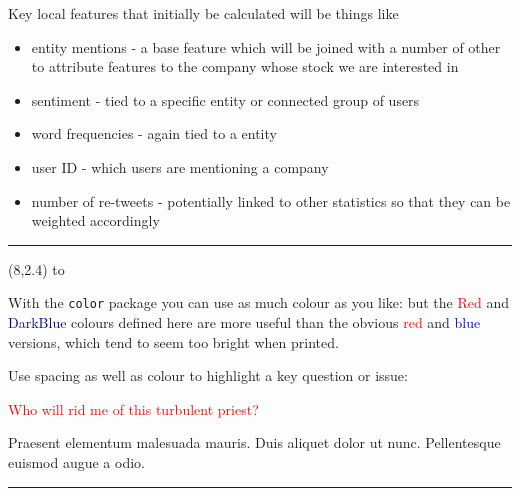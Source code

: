 \documentclass[a0]{a0poster}
\def\Head#1{\noindent\hbox to \hsize{\hfil{\LARGE\color{DarkBlue}\sf #1}}\bigskip}
\begin{document}
\begin{textblock}{7}
\sf
Key local features that initially be calculated will be things like
\begin{itemize}
\item entity mentions - a base feature which will be joined with a number of other to attribute features to the company whose stock we are interested in
\item sentiment - tied to a specific entity or connected group of users
\item word frequencies - again tied to a entity
\item user ID - which users are mentioning a company
\item number of re-tweets - potentially linked to other statistics so that they can be weighted accordingly
\end{itemize}

\bigskip
\hrule
\end{textblock}

\begin{textblock}{7}(8,2.4)
\Head{Use of Colour}

\sf
With the {\tt color} package you can use as much colour as you like: but the \textcolor{Red}{Red} and \textcolor{DarkBlue}{DarkBlue} colours defined here are more useful than the obvious \textcolor{red}{red} and \textcolor{blue}{blue} versions, which tend to seem too bright when printed.

Use spacing as well as colour to highlight a key question or issue: 
\vspace*{1.15\baselineskip}
\begin{center}
\textcolor{Red}{Who will rid me of this turbulent priest?}
\end{center} 
\vspace*{1.15\baselineskip}
Praesent elementum malesuada mauris. Duis aliquet dolor ut nunc. Pellentesque euismod augue a odio. 

\bigskip
\hrule
\end{textblock}
\end{document}
